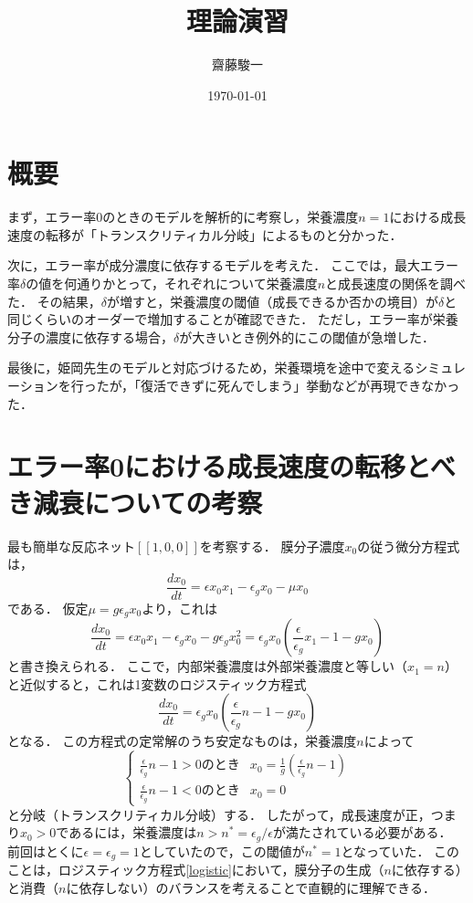 \documentclass[a4paper,11pt]{jsarticle}
\begin{document}
\title{理論演習}
\author{齋藤駿一}
\date{\today}
\maketitle

\section{概要}
まず，エラー率0のときのモデルを解析的に考察し，栄養濃度$n=1$における成長速度の転移が「トランスクリティカル分岐」によるものと分かった．

次に，エラー率が成分濃度に依存するモデルを考えた．
ここでは，最大エラー率$\delta$の値を何通りかとって，それぞれについて栄養濃度$n$と成長速度の関係を調べた．
その結果，$\delta$が増すと，栄養濃度の閾値（成長できるか否かの境目）が$\delta$と同じくらいのオーダーで増加することが確認できた．
ただし，エラー率が栄養分子の濃度に依存する場合，$\delta$が大きいとき例外的にこの閾値が急増した．

最後に，姫岡先生のモデルと対応づけるため，栄養環境を途中で変えるシミュレーションを行ったが，「復活できずに死んでしまう」挙動などが再現できなかった．

\section{エラー率0における成長速度の転移とべき減衰についての考察}

最も簡単な反応ネット$[[1,0,0]]$を考察する．
膜分子濃度$x_0$の従う微分方程式は，
\begin{equation}
  \frac{dx_0}{dt} = \epsilon x_0 x_1 - \epsilon_g x_0 - \mu x_0 
\end{equation}
である．
仮定$\mu = g\epsilon_g x_0$より，これは
\begin{equation}
  \frac{dx_0}{dt} = \epsilon x_0 x_1 - \epsilon_g x_0 - g \epsilon_g x^2_0 = \epsilon_g x_0 (\frac{\epsilon}{\epsilon_g} x_1 - 1 - g x_0)
\end{equation}
と書き換えられる．
ここで，内部栄養濃度は外部栄養濃度と等しい（$x_1 = n$）と近似すると，これは1変数のロジスティック方程式
\begin{equation}
  \frac{dx_0}{dt} = \epsilon_g x_0 (\frac{\epsilon}{\epsilon_g} n - 1 - g x_0) \label{logistic}
\end{equation}
となる．
この方程式の定常解のうち安定なものは，栄養濃度$n$によって
\begin{equation}
  \begin{cases}
    \frac{\epsilon}{\epsilon_g} n - 1 > 0 \text{のとき} & x_0 = \frac{1}{g} \left( \frac{\epsilon}{\epsilon_g} n - 1 \right) \\
    \frac{\epsilon}{\epsilon_g} n - 1 < 0 \text{のとき} & x_0 = 0
  \end{cases}
\end{equation}
と分岐（トランスクリティカル分岐）する．
したがって，成長速度が正，つまり$x_0 > 0$であるには，栄養濃度は$n > n^* = \epsilon_g/\epsilon$が満たされている必要がある．
前回はとくに$\epsilon = \epsilon_g = 1$としていたので，この閾値が$n^*=1$となっていた．
このことは，ロジスティック方程式\eqref{logistic}において，膜分子の生成（$n$に依存する）と消費（$n$に依存しない）のバランスを考えることで直観的に理解できる．
\end{document}
